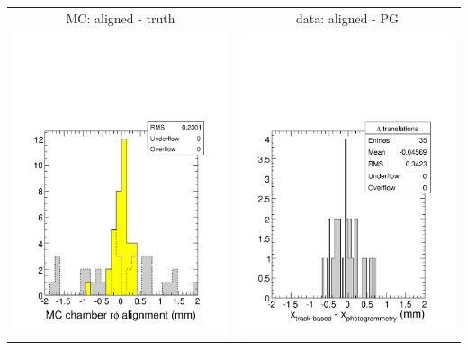 \documentclass[compress]{beamer}
\begin{document}
\begin{frame}
\begin{columns}
\vspace{0.2 cm}
\begin{tabular}{c c}
MC: aligned - truth & data: aligned - PG \\
\includegraphics[width=0.45\linewidth]{mcchamber_rphi.pdf} &
\includegraphics[width=0.45\linewidth]{delta_translations.pdf}
\end{tabular}
\end{columns}
\end{frame}
\end{document}
